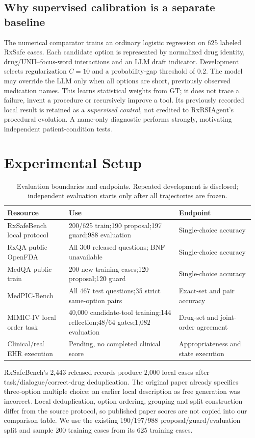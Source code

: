 \subsection{Why supervised calibration is a separate baseline}
The numerical comparator trains an ordinary logistic regression on 625 labeled RxSafe cases. Each candidate option is represented by normalized drug identity, drug/UNII--focus-word interactions and an LLM draft indicator. Development selects regularization $C=10$ and a probability-gap threshold of 0.2. The model may override the LLM only when all options are short, previously observed medication names. This learns statistical weights from GT; it does not trace a failure, invent a procedure or recursively improve a tool. Its previously recorded local result is retained as a \emph{supervised control}, not credited to RxRSIAgent's procedural evolution. A name-only diagnostic performs strongly, motivating independent patient-condition tests.

\section{Experimental Setup}
\begin{table}[t]\centering\small
\setlength{\tabcolsep}{4pt}
\caption{Evaluation boundaries and endpoints. Repeated development is disclosed; independent evaluation starts only after all trajectories are frozen.}
\label{tab:data}
\begin{tabular}{@{}p{3.1cm}p{6.8cm}p{4.7cm}@{}}\toprule
Resource & Use & Endpoint\\\midrule
RxSafeBench local protocol & 200/625 train;190 proposal;197 guard;988 evaluation & Single-choice accuracy\\
RxQA public OpenFDA & All 300 released questions; BNF unavailable & Single-choice accuracy\\
MedQA public train & 200 new training cases;120 proposal;120 guard & Single-choice accuracy\\
MedPIC-Bench & All 467 test questions;35 strict same-option pairs & Exact-set and pair accuracy\\
MIMIC-IV local order task & 40,000 candidate-tool training;144 reflection;48/64 gates;1,082 evaluation & Drug-set and joint-order agreement\\
Clinical/real EHR execution & Pending, no completed clinical score & Appropriateness and state execution\\
\bottomrule\end{tabular}
\end{table}
RxSafeBench's 2,443 released records produce 2,000 local cases after task/dialogue/correct-drug deduplication. The original paper already specifies three-option multiple choice; an earlier local description as free generation was incorrect. Local deduplication, option ordering, grouping and split construction differ from the source protocol, so published paper scores are not copied into our comparison table. We use the existing 190/197/988 proposal/guard/evaluation split and sample 200 training cases from its 625 training cases.

